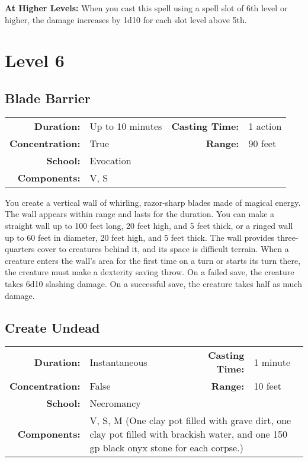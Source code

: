 \documentclass[a5paper, 12pt]{memoir}
\begin{document}
\vspace{8pt} \noindent\textbf{At Higher Levels:} When you cast this spell using a spell slot of 6th level or higher, the damage increases by 1d10 for each slot level above 5th.
\newpage
\chapter*{Level 6} 
\section*{Blade Barrier}

{
\small\centering\vspace{-6pt}
\begin{tabular}{rlrl}
\toprule

\textbf{Duration:} & Up to 10 minutes &
\textbf{Casting Time:} & 1 action \\
\textbf{Concentration:} & True &
\textbf{Range:} & 90 feet \\
\textbf{School:} & Evocation \\
\textbf{Components:} & \multicolumn{3}{p{0.7\textwidth}}{V, S}\\

\bottomrule
\end{tabular}
}

\vspace{1\baselineskip}\noindent You create a vertical wall of whirling, razor-sharp blades made of magical energy. The wall appears within range and lasts for the duration. You can make a straight wall up to 100 feet long, 20 feet high, and 5 feet thick, or a ringed wall up to 60 feet in diameter, 20 feet high, and 5 feet thick. The wall provides three-quarters cover to creatures behind it, and its space is difficult terrain. When a creature enters the wall's area for the first time on a turn or starts its turn there, the creature must make a dexterity saving throw. On a failed save, the creature takes 6d10 slashing damage. On a successful save, the creature takes half as much damage.

\newpage
\section*{Create Undead}

{
\small\centering\vspace{-6pt}
\begin{tabular}{rlrl}
\toprule

\textbf{Duration:} & Instantaneous &
\textbf{Casting Time:} & 1 minute \\
\textbf{Concentration:} & False &
\textbf{Range:} & 10 feet \\
\textbf{School:} & Necromancy \\
\textbf{Components:} & \multicolumn{3}{p{0.7\textwidth}}{V, S, M (One clay pot filled with grave dirt, one clay pot filled with brackish water, and one 150 gp black onyx stone for each corpse.)}\\

\bottomrule
\end{tabular}
}
\end{document}
